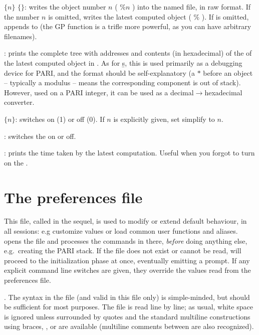  $\{n\}$ $\{$$\}$: writes the object number
$n$ ( $\%n$ ) into the named file, in raw format. If the number $n$ is
omitted, writes the latest computed object ( $\%$ ). If  is
omitted, appends to  (the GP function  is a trifle more
powerful, as you can have arbitrary filenames).

: prints the complete tree with addresses and contents (in
hexadecimal) of the  of the latest computed
object in . As for \b{s}, this is used primarily as a debugging device for
PARI, and the format should be self-explanatory (a $*$ before an object --
typically a modulus -- means the corresponding component is out of stack).
However, used on a PARI integer, it can be used as a
decimal$\rightarrow$hexadecimal converter.

 $\{n\}$: switches  on (1) or off (0). If $n$
is explicitly given, set simplify to $n$.

\subseckbd{\#}: switches the  on or off.

\subseckbd{\#\#}: prints the time taken by the latest computation.
Useful when you forgot to turn on the .


\section{The preferences file}
\label{se:gprc}

This file, called  in the sequel, is used to modify or extend
default behaviour, in all  sessions: e.g customize  values or
load common user functions and aliases.  opens the  file and
processes the commands in there, \emph{before} doing anything else,
e.g.~creating the PARI stack. If the file does not exist or cannot be read,
 will proceed to the initialization phase at once, eventually emitting a
prompt. If any explicit command line switches are given, they override the
values read from the preferences file.

. The syntax in the  file (and valid in this file
only) is simple-minded, but should be sufficient for most purposes. The file
is read line by line; as usual, white space is ignored unless surrounded by
quotes and the standard multiline constructions using braces, \kbd{\bs}, or
\kbd{=} are available (multiline comments between \kbd{/*~\dots~*/} are also
recognized).

